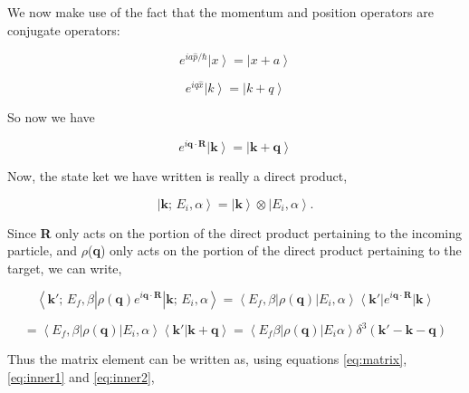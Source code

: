 \documentclass{article}
\begin{document}
			We now make use of the fact that the momentum and position operators are conjugate operators:
		
			$$e^{ia\hat{p}/\hbar}\left|x\right>=\left|x+a\right>$$
			
			$$e^{iq\hat{x}}\left|k\right>=\left|k+q\right>$$
			
			So now we have
			
			$$e^{i\mathbf{q}\cdot\mathbf{R}}\left|\mathbf{k}\right>=\left|\mathbf{k}+\mathbf{q}\right>$$
			
			Now, the state ket we have written is really a direct product,
			
			\begin{equation} \label{eq:dir-prod}
			\left|\mathbf{k};\,E_i,\alpha\right> = \left|\mathbf{k}\right> \otimes \left|E_i,\alpha\right>.
			\end{equation}
			
			Since \textbf{R} only acts on the portion of the direct product pertaining to the incoming particle, and $\rho$(\textbf{q}) only acts on the portion of the direct product pertaining to the target, we can write,
			
			\begin{equation} \label{eq:inner1}
			\left<\mathbf{k}';\,E_f,\beta\left| \rho(\mathbf{q}) e^{i\mathbf{q}\cdot\mathbf{R}}\right|\mathbf{k};\,E_i,\alpha\right> = \left<E_f,\beta\left| \rho(\mathbf{q}) \right|E_i,\alpha\right> \left<\mathbf{k}'\right|e^{i\mathbf{q}\cdot\mathbf{R}}\left.|\mathbf{k}\right>
			\end{equation}
			
			\begin{equation} \label{eq:inner2}
			 = \left<E_f,\beta\left| \rho(\mathbf{q}) \right|E_i,\alpha\right>  \left<\mathbf{k}'\right|\left.\mathbf{k}+\mathbf{q}\right> = \left<E_f\beta\left| \rho(\mathbf{q}) \right|E_i\alpha\right> \delta^3(\mathbf{k}'-\mathbf{k}-\mathbf{q})
			 \end{equation}
			
			Thus the matrix element can be written as, using equations \ref{eq:matrix}, \ref{eq:inner1} and \ref{eq:inner2},
			
\end{document}
